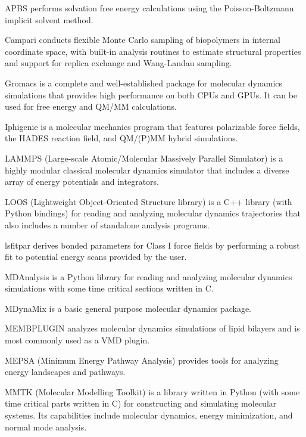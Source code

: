 APBS \cite{Baker_2001} performs solvation free energy calculations using the Poisson-Boltzmann implicit solvent method.

Campari \cite{Vitalis_2009} conducts flexible Monte Carlo sampling of biopolymers in internal coordinate space, with built-in analysis routines to estimate structural properties and support for replica exchange and Wang-Landau sampling.

Gromacs \cite{Pronk_2013} is a complete and well-established package for molecular dynamics simulations that provides high performance on both CPUs and GPUs.  It can be used for free energy and QM/MM calculations.

Iphigenie \cite{Lorenzen_2012} is a molecular mechanics program that features polarizable force fields, the HADES reaction field, and QM/(P)MM hybrid simulations.

LAMMPS  (Large-scale Atomic/Molecular Massively Parallel Simulator) \cite{Plimpton_1995} is a highly modular classical molecular dynamics simulator that includes a diverse array of energy potentials and integrators.

LOOS (Lightweight Object-Oriented Structure library) \cite{Romo_2014} is a C++ library (with Python bindings) for reading and analyzing molecular dynamics trajectories that also includes a number of standalone analysis programs.

lsfitpar \cite{Vanommeslaeghe_2015} derives bonded parameters for Class I force fields by performing a robust fit to potential energy scans provided by the user.

MDAnalysis  \cite{Michaud_Agrawal_2011} is a Python library for reading and analyzing molecular dynamics simulations with some time critical sections written in C.

MDynaMix \cite{Lyubartsev_2000} is a basic general purpose molecular dynamics package.

MEMBPLUGIN \cite{Guixa-Gonzalez_2014} analyzes molecular dynamics simulations of lipid bilayers and is most commonly used as a VMD plugin.

MEPSA (Minimum Energy Pathway Analysis) \cite{Marcos_Alcalde_2015} provides tools for analyzing energy landscapes and pathways.

MMTK (Molecular Modelling Toolkit) \cite{Hinsen_2000} is a library written in Python (with some time critical parts written in C) for constructing and simulating molecular systems.  Its capabilities include molecular dynamics, energy minimization, and normal mode analysis.

